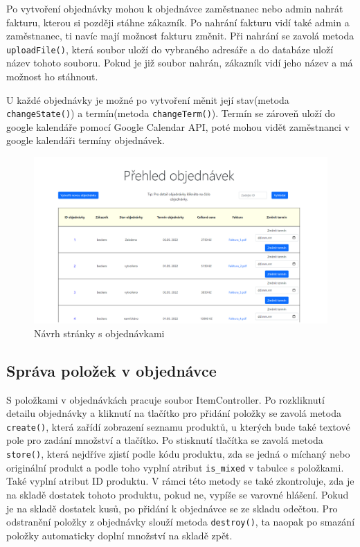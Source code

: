 Po vytvoření objednávky mohou k objednávce zaměstnanec nebo admin nahrát fakturu, kterou si později stáhne zákazník. Po nahrání fakturu vidí také admin a zaměstnanec, ti navíc mají možnost fakturu změnit. Při nahrání se zavolá metoda \texttt{uploadFile()}, která soubor uloží do vybraného adresáře a do databáze uloží název tohoto souboru. Pokud je již soubor nahrán, zákazník vidí jeho název a má možnost ho stáhnout.

U každé objednávky je možné po vytvoření měnit její stav(metoda \texttt{changeState()}) a termín(metoda \texttt{changeTerm()}). Termín se zároveň uloží do google kalendáře pomocí Google Calendar API, poté mohou vidět zaměstnanci v google kalendáři termíny objednávek.

\begin{figure}[H]
    \centering
    \includegraphics[width=160mm]{obrazky-figures/objednavkyNew.png}
    \caption{Návrh stránky s objednávkami}
\end{figure}




\subsection{Správa položek v objednávce}

S položkami v objednávkách pracuje soubor ItemController. Po rozkliknutí detailu objednávky a kliknutí na tlačítko pro přidání položky se zavolá metoda \texttt{create()}, která zařídí zobrazení seznamu produktů, u kterých bude také textové pole pro zadání množství a tlačítko. Po stisknutí tlačítka se zavolá metoda \texttt{store()}, která nejdříve zjistí podle kódu produktu, zda se jedná o míchaný nebo originální produkt a podle toho vyplní atribut \texttt{is\_mixed} v tabulce s položkami. Také vyplní atribut ID produktu. V rámci této metody se také zkontroluje, zda je na skladě dostatek tohoto produktu, pokud ne, vypíše se varovné hlášení. Pokud je na skladě dostatek kusů, po přidání k objednávce se ze skladu odečtou. Pro odstranění položky z objednávky slouží metoda \texttt{destroy()}, ta naopak po smazání položky automaticky doplní množství na skladě zpět.

